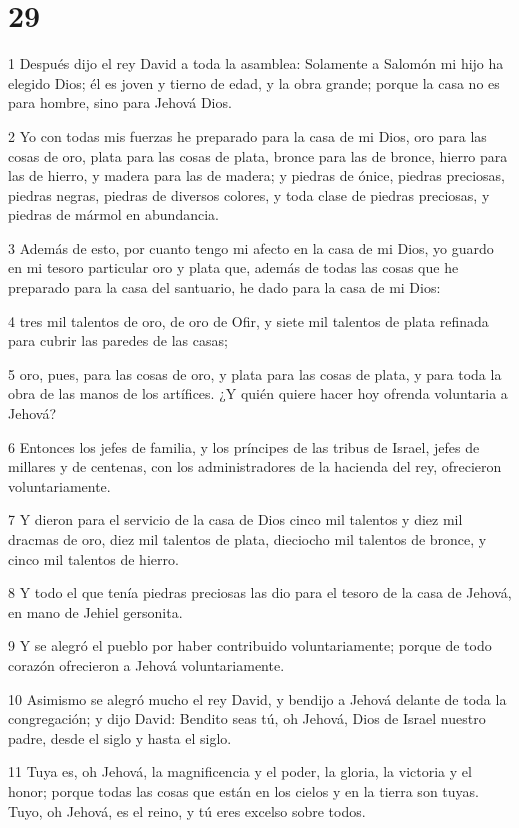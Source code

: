 \chapter{29}

\par 1 Después dijo el rey David a toda la asamblea: Solamente a Salomón mi hijo ha elegido Dios; él es joven y tierno de edad, y la obra grande; porque la casa no es para hombre, sino para Jehová Dios.
\par 2 Yo con todas mis fuerzas he preparado para la casa de mi Dios, oro para las cosas de oro, plata para las cosas de plata, bronce para las de bronce, hierro para las de hierro, y madera para las de madera; y piedras de ónice, piedras preciosas, piedras negras, piedras de diversos colores, y toda clase de piedras preciosas, y piedras de mármol en abundancia. 
\par 3 Además de esto, por cuanto tengo mi afecto en la casa de mi Dios, yo guardo en mi tesoro particular oro y plata que, además de todas las cosas que he preparado para la casa del santuario, he dado para la casa de mi Dios:
\par 4 tres mil talentos de oro,  de oro de Ofir, y siete mil talentos de plata refinada para cubrir las paredes de las casas;
\par 5 oro, pues, para las cosas de oro, y plata para las cosas de plata, y para toda la obra de las manos de los artífices. ¿Y quién quiere hacer hoy ofrenda voluntaria a Jehová?
\par 6 Entonces los jefes de familia, y los príncipes de las tribus de Israel, jefes de millares y de centenas, con los administradores de la hacienda del rey, ofrecieron voluntariamente.
\par 7 Y dieron para el servicio de la casa de Dios cinco mil talentos   y diez mil dracmas de oro, diez mil talentos de plata, dieciocho mil talentos de bronce, y cinco mil talentos de hierro.
\par 8 Y todo el que tenía piedras preciosas las dio para el tesoro de la casa de Jehová, en mano de Jehiel gersonita.
\par 9 Y se alegró el pueblo por haber contribuido voluntariamente; porque de todo corazón ofrecieron a Jehová voluntariamente.
\par 10 Asimismo se alegró mucho el rey David, y bendijo a Jehová delante de toda la congregación; y dijo David: Bendito seas tú, oh Jehová, Dios de Israel nuestro padre, desde el siglo y hasta el siglo.
\par 11 Tuya es, oh Jehová, la magnificencia y el poder, la gloria, la victoria y el honor; porque todas las cosas que están en los cielos y en la tierra son tuyas. Tuyo, oh Jehová, es el reino, y tú eres excelso sobre todos.
